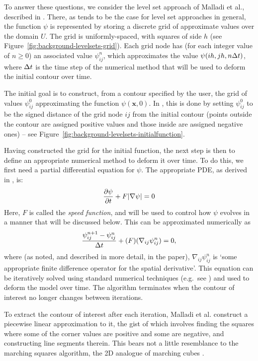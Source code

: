 \noindent To answer these questions, we consider the level set approach of Malladi et al., described in \cite{malladi95}. There, as tends to be the case for level set approaches in general, the function $\psi$ is represented by storing a discrete grid of approximate values over the domain $U$. The grid is uniformly-spaced, with squares of side $h$ (see Figure~\ref{fig:background-levelsets-grid}). Each grid node has (for each integer value of $n \ge 0$) an associated value $\psi_{ij}^n$, which approximates the value $\psi(ih,jh,n\Delta t)$, where $\Delta t$ is the time step of the numerical method that will be used to deform the initial contour over time.


The initial goal is to construct, from a contour specified by the user, the grid of values $\psi_{ij}^0$ approximating the function $\psi(\mathbf{x},0)$. In \cite{malladi95}, this is done by setting $\psi_{ij}^0$ to be the signed distance of the grid node $ij$ from the initial contour (points outside the contour are assigned positive values and those inside are assigned negative ones) -- see Figure~\ref{fig:background-levelsets-initialfunction}.


Having constructed the grid for the initial function, the next step is then to define an appropriate numerical method to deform it over time. To do this, we first need a partial differential equation for $\psi$. The appropriate PDE, as derived in \cite{malladi95}, is:
%
\[
\frac{\partial \psi}{\partial t} + F|\nabla \psi| = 0
\]
%
Here, $F$ is called the \emph{speed function}, and will be used to control how $\psi$ evolves in a manner that will be discussed below. This can be approximated numerically as
%
\[
\frac{\psi_{ij}^{n+1} - \psi_{ij}^n}{\Delta t} + (F)(\nabla_{ij} \psi_{ij}^n) = 0,
\]
%
where (as noted, and described in more detail, in the paper), $\nabla_{ij} \psi_{ij}^n$ is `some appropriate finite difference operator for the spatial derivative'. This equation can be iteratively solved using standard numerical techniques (e.g.~see \cite{morton05}) and used to deform the model over time. The algorithm terminates when the contour of interest no longer changes between iterations.

To extract the contour of interest after each iteration, Malladi et al. construct a piecewise linear approximation to it, the gist of which involves finding the squares where some of the corner values are positive and some are negative, and constructing line segments therein. This bears not a little resemblance to the marching squares algorithm, the 2D analogue of marching cubes \cite{lorensen87}.

